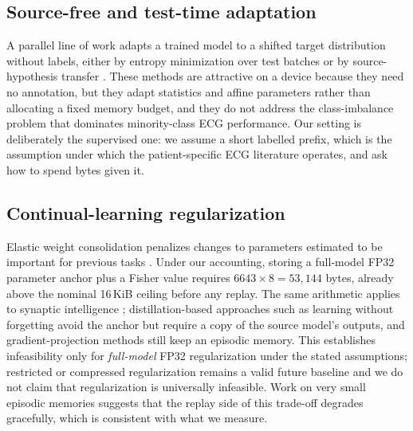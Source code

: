 \subsection{Source-free and test-time adaptation}

A parallel line of work adapts a trained model to a shifted target distribution
without labels, either by entropy minimization over test batches
\cite{wang2021tent} or by source-hypothesis transfer \cite{liang2020shot}. These
methods are attractive on a device because they need no annotation, but they
adapt statistics and affine parameters rather than allocating a fixed memory
budget, and they do not address the class-imbalance problem that dominates
minority-class ECG performance. Our setting is deliberately the supervised one:
we assume a short labelled prefix, which is the assumption under which the
patient-specific ECG literature operates, and ask how to spend bytes given it.

\subsection{Continual-learning regularization}

Elastic weight consolidation penalizes changes to parameters estimated to be
important for previous tasks \cite{kirkpatrick2017overcoming}. Under our
accounting, storing a full-model FP32 parameter anchor plus a Fisher value
requires $6643\times8=53{,}144$ bytes, already above the nominal 16\,KiB
ceiling before any replay. The same arithmetic applies to synaptic
intelligence \cite{zenke2017si}; distillation-based approaches such as learning
without forgetting \cite{li2018lwf} avoid the anchor but require a copy of the
source model's outputs, and gradient-projection methods \cite{lopezpaz2017gem}
still keep an episodic memory. This establishes infeasibility only for
\emph{full-model} FP32 regularization under the stated assumptions; restricted or
compressed regularization remains a valid future baseline and we do not claim
that regularization is universally infeasible. Work on very small episodic
memories \cite{chaudhry2019tiny} suggests that the replay side of this trade-off
degrades gracefully, which is consistent with what we measure.

